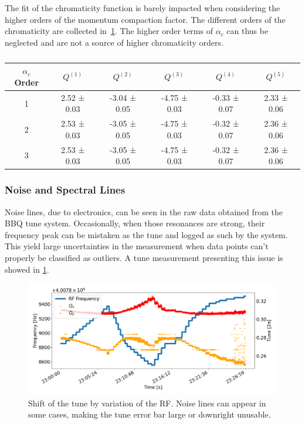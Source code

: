 The fit of the chromaticity function is barely impacted when considering the higher orders of the 
momentum compaction factor. The different orders of the chromaticity are collected
in~\cref{table:decapoles:chromaticity:alpha_c_chroma}.
The higher order terms of $\alpha_c$ can thus be neglected and are not a source of higher
chromaticity orders.

\begin{table}[tbh]
    \begin{tabular}{c|ccccc}
        $\alpha_c$ Order & $Q^{(1)}$ & $Q^{(2)}$ & $Q^{(3)}$ & $Q^{(4)}$ & $Q^{(5)}$\\
        \hline
        1 & 2.52 ± 0.03 & -3.04 ± 0.05 & -4.75 ± 0.03 & -0.33 ± 0.07 & 2.33 ± 0.06 \\
        2 & 2.53 ± 0.03 & -3.05 ± 0.05 & -4.75 ± 0.03 & -0.32 ± 0.07 & 2.36 ± 0.06 \\
        3 & 2.53 ± 0.03 & -3.05 ± 0.05 & -4.75 ± 0.03 & -0.32 ± 0.07 & 2.36 ± 0.06 \\
        \end{tabular}
    \caption{}
    \label{table:decapoles:chromaticity:alpha_c_chroma}
\end{table}



\subsubsection{Noise and Spectral Lines}

Noise lines, due to electronics, can be seen in the raw data obtained from the BBQ tune system.
Occasionally, when those resonances are strong, their frequency peak can be mistaken as the tune and
logged as such by the system. This yield large uncertainties in the measurement when data points 
can't properly be classified as outliers. A tune measurement presenting this issue is showed in 
\cref{fig:decapoles:chromaticity:noisy_tune}.

\begin{figure}[tbh]
    \includegraphics[width=\textwidth]{./images/noisy_tune.png}
    \caption{Shift of the tune by variation of the RF. Noise lines can appear in some cases,
    making the tune error bar large or downright unusable.}
    \label{fig:decapoles:chromaticity:noisy_tune}
\end{figure}

